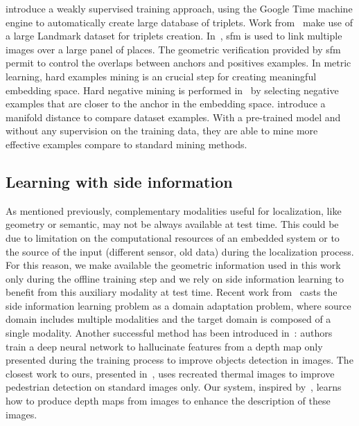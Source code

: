 \citet{Arandjelovic2017} introduce a weakly supervised training approach, using the Google Time machine engine to automatically create large database of triplets. Work from~\citep{Gordo2017,Noh2017} make use of a large Landmark dataset for triplets creation. In~\citep{Radenovic2016,Radenovic2017}, \ac{sfm} is used to link multiple images over a large panel of places. The geometric verification provided by \ac{sfm} permit to control the overlaps between anchors and positives examples. In metric learning, hard examples mining is an crucial step for creating meaningful embedding space. Hard negative mining is performed in~\citep{Arandjelovic2017,Radenovic2017,Gordo2016} by selecting negative examples that are closer to the anchor in the embedding space. \citet{Iscen2018} introduce a manifold distance to compare dataset examples. With a pre-trained model and without any supervision on the training data, they are able to mine more effective examples compare to standard mining methods.

\subsection{Learning with side information}
As mentioned previously, complementary modalities useful for localization, like geometry or semantic, may not be always available at test time. This could be due to limitation on the computational resources of an embedded system or to the source of the input (different sensor, old data) during the localization process. For this reason, we make available the geometric information used in this work only during the offline training step and we rely on side information learning to benefit from this auxiliary modality at test time. Recent work from~\cite{Li2017b} casts the side information learning problem as a domain adaptation problem, where source domain includes multiple modalities and the target domain is composed of a single modality. Another successful method has been introduced in~\cite{Hoffman2016}: authors train a deep neural network to hallucinate features from a depth map only presented during the training process to improve objects detection in images. The closest work to ours, presented in~\citep{Xu2017b}, uses recreated thermal images to improve pedestrian detection on standard images only. Our system, inspired by~\citep{Xu2017b}, learns how to produce depth maps from images to enhance the description of these images.

